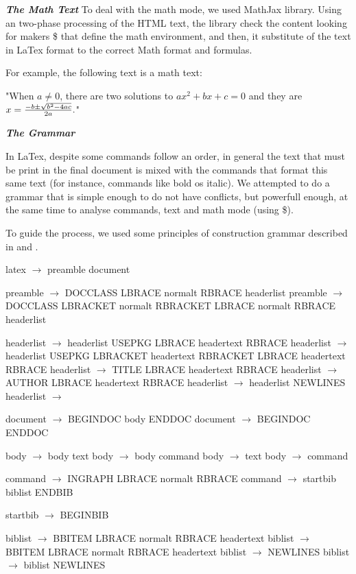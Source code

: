 \documentclass{article}
\begin{document}
\textit{\textbf{The Math Text}}
To deal with the math mode, we used MathJax library. Using an two-phase processing of the HTML text, the library check the content looking for makers \$ that define the math environment, and then, it substitute of the text in LaTex format to the correct Math format and formulas.

For example, the following text is a math text:

"When $a \ne 0$, there are two solutions to $ax^2 + bx + c = 0$ and they are $x = {-b \pm \sqrt{b^2-4ac} \over 2a}.$"

\textit{\textbf{The Grammar}}

In LaTex, despite some commands follow an order, in general the text that must be print in the final document is mixed with the commands that format this same text (for instance, commands like bold os italic). We attempted to do a grammar that is simple enough to do not have conflicts, but powerfull enough, at the same time to analyse commands, text and math mode (using \$).

To guide the process, we used some principles of construction grammar described in \cite{Appel02} and \cite{Aho86}.

latex $\rightarrow$ preamble document

preamble $\rightarrow$ DOCCLASS LBRACE normalt RBRACE headerlist 
preamble $\rightarrow$ DOCCLASS LBRACKET normalt RBRACKET LBRACE normalt RBRACE headerlist

headerlist $\rightarrow$ headerlist USEPKG LBRACE headertext RBRACE
headerlist $\rightarrow$ headerlist USEPKG LBRACKET headertext RBRACKET LBRACE headertext RBRACE
headerlist $\rightarrow$ TITLE LBRACE headertext RBRACE
headerlist $\rightarrow$ AUTHOR LBRACE headertext RBRACE
headerlist $\rightarrow$ headerlist NEWLINES
headerlist $\rightarrow$

document $\rightarrow$ BEGINDOC body ENDDOC
document $\rightarrow$ BEGINDOC ENDDOC

body $\rightarrow$ body text
body $\rightarrow$ body command
body $\rightarrow$ text
body $\rightarrow$ command

command $\rightarrow$ INGRAPH LBRACE normalt RBRACE
command $\rightarrow$ startbib biblist ENDBIB

startbib $\rightarrow$ BEGINBIB

biblist $\rightarrow$  BBITEM LBRACE normalt RBRACE headertext
biblist $\rightarrow$ BBITEM LBRACE normalt RBRACE headertext
biblist $\rightarrow$ NEWLINES
biblist $\rightarrow$ biblist NEWLINES
\end{document}
